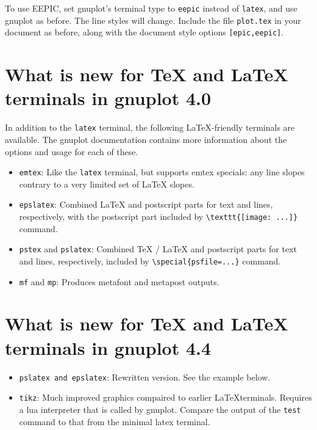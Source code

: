 To use EEPIC, set gnuplot's terminal type to {\tt eepic} instead of
{\tt latex}, and use gnuplot as before. The line styles will change.
Include the file {\tt plot.tex} in your document as before, along with
the document style options {\tt [epic,eepic]}.

\section{What is new for \TeX{} and \LaTeX{} terminals in gnuplot 4.0}

In addition to the \texttt{latex} terminal, the following \LaTeX-friendly
terminals are available. The gnuplot documentation contains more information
about the options and usage for each of these.

\begin{itemize}
\item \texttt{emtex}: Like the \texttt{latex} terminal, but supports emtex
specials: any line slopes contrary to a very limited set of \LaTeX{} slopes.

\item \texttt{epslatex}: Combined \LaTeX{} and postscript parts for text and
lines, respectively, with the postscript part included by
\verb+\texttt{[image: ...]}+ command.

\item \texttt{pstex} and \texttt{pslatex}: Combined \TeX{} / \LaTeX{} and 
postscript parts for text and lines, respectively, included by
\verb+\special{psfile=...}+ command.

\item \texttt{mf} and \texttt{mp}: Produces metafont and metapost outputs.

\end{itemize}


\section{What is new for \TeX{} and \LaTeX{} terminals in gnuplot 4.4}

\begin{itemize}

\item \texttt{pslatex and epslatex}:  Rewritten version.  See the example below. 

\item \texttt{tikz}:  Much improved graphics compaired to earlier \LaTeX terminals.  
Requires a lua interpreter that is called by gnuplot. Compare the output
of the \texttt{test} command to that from the minimal latex terminal.

\end{itemize}

